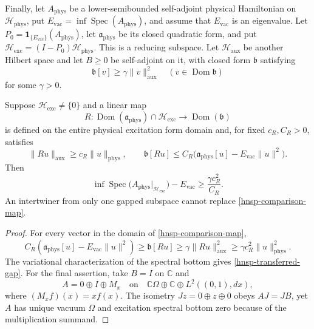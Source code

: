 Finally, let \(A_{\mathrm{phys}}\) be a lower-semibounded self-adjoint
physical Hamiltonian on \(\mathcal H_{\mathrm{phys}}\), put
\(E_{\mathrm{vac}}=\inf\operatorname{Spec}(A_{\mathrm{phys}})\), and assume
that \(E_{\mathrm{vac}}\) is an eigenvalue.  Let
\(P_0=\boldsymbol 1_{\{E_{\mathrm{vac}}\}}(A_{\mathrm{phys}})\), let
\(\mathfrak a_{\mathrm{phys}}\) be its closed quadratic form, and put
\(\mathcal H_{\mathrm{exc}}=(I-P_0)\mathcal H_{\mathrm{phys}}\).  This is a
reducing subspace.  Let \(\mathcal H_{\mathrm{aux}}\) be another Hilbert
space and let \(B\geq0\) be self-adjoint on it, with closed form
\(\mathfrak b\) satisfying
\begin{equation}
 \mathfrak b[v]\geq\gamma\|v\|_{\mathrm{aux}}^2
 \quad(v\in\operatorname{Dom}\mathfrak b)
 \label{hnsp-auxiliary-gap}
\end{equation}
for some \(\gamma>0\).

\begin{theorem}
\label{hnsp-coercive-transfer}
 Suppose \(\mathcal H_{\mathrm{exc}}\ne\{0\}\) and a linear map
\begin{equation}
 R:\operatorname{Dom}(\mathfrak a_{\mathrm{phys}})
   \cap\mathcal H_{\mathrm{exc}}
 \longrightarrow\operatorname{Dom}(\mathfrak b)
 \label{hnsp-comparison-map}
\end{equation}
is defined on the entire physical excitation form domain and, for fixed
\(c_R,C_R>0\), satisfies
\begin{equation}
 \|Ru\|_{\mathrm{aux}}\geq c_R\|u\|_{\mathrm{phys}},
 \qquad
 \mathfrak b[Ru]\leq
 C_R\bigl(\mathfrak a_{\mathrm{phys}}[u]
             -E_{\mathrm{vac}}\|u\|^2\bigr).
 \label{hnsp-coercive-comparison}
\end{equation}
Then
\begin{equation}
 \inf\operatorname{Spec}
 \bigl(A_{\mathrm{phys}}|_{\mathcal H_{\mathrm{exc}}}\bigr)-E_{\mathrm{vac}}
 \geq\frac{\gamma c_R^2}{C_R}.
 \label{hnsp-transferred-gap}
\end{equation}
An intertwiner from only one gapped subspace cannot replace
\eqref{hnsp-comparison-map}.
\end{theorem}

\begin{proof}
For every vector in the domain of \eqref{hnsp-comparison-map},
\[
 C_R(\mathfrak a_{\mathrm{phys}}[u]-E_{\mathrm{vac}}\|u\|^2)
 \geq\mathfrak b[Ru]\geq\gamma\|Ru\|_{\mathrm{aux}}^2
 \geq\gamma c_R^2\|u\|_{\mathrm{phys}}^2.
\]
The variational characterization of the spectral bottom gives
\eqref{hnsp-transferred-gap}.  For the final assertion, take \(B=I\) on
\(\mathbb C\) and
\[
 A=0\oplus I\oplus M_x
 \quad\text{on}\quad
 \mathbb C\Omega\oplus\mathbb C\oplus L^2((0,1),dx),
\]
where \((M_x f)(x)=x f(x)\).  The isometry \(Jz=0\oplus z\oplus0\) obeys
\(AJ=JB\), yet \(A\) has unique vacuum \(\Omega\) and excitation spectral
bottom zero because of the multiplication summand.
\end{proof}

